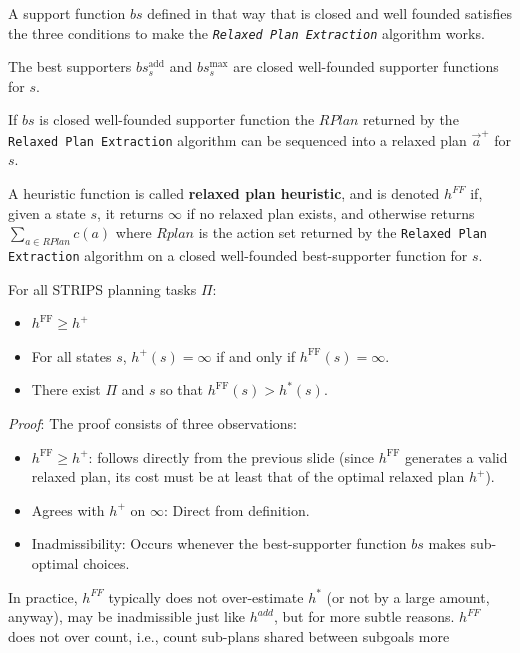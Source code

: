 \documentclass[10pt, letterpaper]{report}
\begin{document}
A support function $bs$ defined in that way that is closed and well founded satisfies the three conditions to make the \textit{\texttt{Relaxed Plan Extraction}} algorithm works.
\begin{proposition}
    The best supporters $bs_s^{\text{add}}$ and $bs_s^{\max}$ are closed well-founded supporter functions for $s$.
\end{proposition}
\begin{proposition}
    If $bs$ is closed well-founded supporter function the $RPlan$ returned by the \texttt{Relaxed Plan Extraction} algorithm can be sequenced into a relaxed plan $\vec a^+$ for $s$.
\end{proposition}
\begin{definition}
    A heuristic function is called \textbf{relaxed plan heuristic}, and is denoted $h^{FF}$ if, given a state $s$,  it returns $\infty$ if no relaxed plan
 exists, and otherwise returns $\sum_{a\in RPlan}c(a)$ where $Rplan$ is the action set returned by the \texttt{Relaxed Plan Extraction} algorithm on a closed well-founded best-supporter
 function for $s$.
\end{definition}
\begin{proposition}
For all STRIPS planning tasks $\Pi$:
\begin{itemize}
    \item $h^{\text{FF}} \geq h^+$
    \item For all states $s$, $h^+(s) = \infty$ if and only if $h^{\text{FF}}(s) = \infty$.
    \item There exist $\Pi$ and $s$ so that $h^{\text{FF}}(s) > h^*(s)$.
\end{itemize}
\end{proposition}
\textit{Proof}: The proof consists of three observations:
\begin{itemize}
    \item {$h^{\text{FF}} \geq h^+$:} follows directly from the previous slide (since $h^{\text{FF}}$ generates a valid relaxed plan, its cost must be at least that of the optimal relaxed plan $h^+$).
    \item {Agrees with $h^+$ on $\infty$:} Direct from definition.
    \item {Inadmissibility:} Occurs whenever the best-supporter function $bs$ makes sub-optimal choices.
\end{itemize}
 In practice, $h^{FF}$ typically does not over-estimate $h^*$ (or not by a large
 amount, anyway), may be inadmissible just like $h^{add}$, but for more subtle reasons. $h^{FF}$ does not over count, i.e., count sub-plans shared between subgoals more
\end{document}
